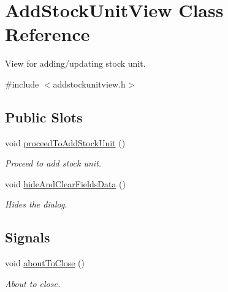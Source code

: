 \hypertarget{class_add_stock_unit_view}{\section{\-Add\-Stock\-Unit\-View \-Class \-Reference}
\label{class_add_stock_unit_view}
}


\-View for adding/updating stock unit.  




{\ttfamily \#include $<$addstockunitview.\-h$>$}

\subsection*{\-Public \-Slots}
\begin{DoxyCompactItemize}
\item 
void \hyperlink{class_add_stock_unit_view_ac26ab7298dd0be756046aaaf45ed89b2}{proceed\-To\-Add\-Stock\-Unit} ()
\begin{DoxyCompactList}\small\item\em \-Proceed to add stock unit. \end{DoxyCompactList}\item 
void \hyperlink{class_add_stock_unit_view_a131f660e9a83ce8eabe00e16c93986f7}{hide\-And\-Clear\-Fields\-Data} ()
\begin{DoxyCompactList}\small\item\em \-Hides the dialog. \end{DoxyCompactList}\end{DoxyCompactItemize}
\subsection*{\-Signals}
\begin{DoxyCompactItemize}
\item 
void \hyperlink{class_add_stock_unit_view_a6b35c4cfc15b9362e577355a066e5d01}{about\-To\-Close} ()
\begin{DoxyCompactList}\small\item\em \-About to close. \end{DoxyCompactList}\end{DoxyCompactItemize}
